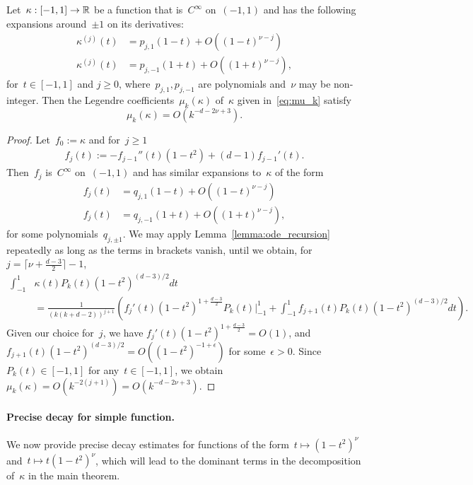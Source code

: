 \begin{lemma}
\label{lemma:diff_decay}
Let~$\kappa: [-1,1] \to {\mathbb R}$ be a function that is~$C^\infty$ on~$(-1,1)$ and has the following expansions around~$\pm 1$ on its derivatives:
\begin{align}
\kappa^{(j)}(t) &= p_{j,1}(1-t) + O((1-t)^{\nu-j}) \\
\kappa^{(j)}(t) &= p_{j,-1}(1+t) + O((1+t)^{\nu-j}), 
\end{align}
for~$t \in [-1, 1]$ and $j \geq 0$, where~$p_{j,1}, p_{j,-1}$ are polynomials and~$\nu$ may be non-integer.
Then the Legendre coefficients~$\mu_k(\kappa)$ of~$\kappa$ given in~\eqref{eq:mu_k} satisfy
\begin{equation}
\mu_k(\kappa) = O(k^{-d-2 \nu + 3}).
\end{equation}
\end{lemma}

\begin{proof}
Let~$f_0 := \kappa$ and for~$j \geq 1$
\begin{align}
f_j(t) := -f_{j-1}''(t)(1 - t^2) + (d-1) f_{j-1}'(t).
\end{align}
Then~$f_j$ is~$C^\infty$ on~$(-1,1)$ and has similar expansions to~$\kappa$ of the form
\begin{align}
f_j(t) &= q_{j,1}(1-t) + O((1-t)^{\nu-j}) \\
f_j(t) &= q_{j,-1}(1+t) + O((1+t)^{\nu-j}),
\end{align}
for some polynomials~$q_{j,\pm 1}$.
We may apply Lemma~\ref{lemma:ode_recursion} repeatedly as long as the terms in brackets vanish, until we obtain, for~$j = \lceil \nu + \frac{d-3}{2} \rceil - 1$,
\begin{align*}
\int_{-1}^1 &\kappa(t) P_k(t) (1 - t^2)^{(d-3)/2} dt \\
	&= \frac{1}{(k(k+d-2))^{j+1}}
\left( f_j'(t) (1 - t^2)^{1 + \frac{d-3}{2}} P_k(t) \Big|_{-1}^1 + \int_{-1}^1 f_{j+1}(t) P_k(t) (1 - t^2)^{(d-3)/2} dt \right).
\end{align*}
Given our choice for~$j$, we have $f_j'(t) (1 - t^2)^{1 + \frac{d-3}{2}} = O(1)$, and $f_{j+1}(t) (1 - t^2)^{(d-3)/2} = O((1-t^2)^{-1+ \epsilon})$ for some~$\epsilon > 0$. Since~$P_k(t) \in [-1, 1]$ for any~$t \in [-1, 1]$, we obtain $\mu_k(\kappa) = O(k^{-2(j+1)}) = O(k^{-d-2 \nu+3})$.
\end{proof}

\paragraph{Precise decay for simple function.}
We now provide precise decay estimates for functions of the form~$t \mapsto (1 - t^2)^\nu$ and~$t \mapsto t(1 - t^2)^\nu$, which will lead to the dominant terms in the decomposition of~$\kappa$ in the main theorem.


